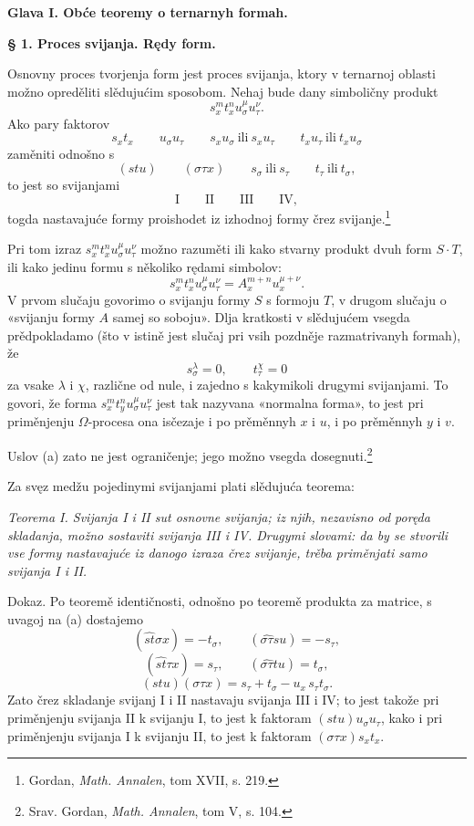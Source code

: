 \documentclass[11pt]{article}
\begin{document}
\begin{center}
{\Large\bfseries Glava I. \quad Obće teoremy o ternarnyh formah.}
\end{center}

\begin{center}
\textbf{§ 1. \quad Proces svijanja. \quad Rędy form.}
\end{center}

Osnovny proces tvorjenja form jest proces svijanja, ktory v ternarnoj oblasti možno opreděliti slědujućim sposobom. Nehaj bude dany simboličny produkt
\[
s_x^m t_x^n u_\sigma^\mu u_\tau^\nu .
\]
Ako pary faktorov
\[
s_xt_x\qquad u_\sigma u_\tau\qquad s_xu_\sigma\ \text{ili}\ s_xu_\tau
\qquad t_xu_\tau\ \text{ili}\ t_xu_\sigma
\]
zaměniti odnošno s
\[
(stu)\qquad (\sigma\tau x)\qquad s_\sigma\ \text{ili}\ s_\tau
\qquad t_\tau\ \text{ili}\ t_\sigma,
\]
to jest so svijanjami
\[
\text{I}\qquad\text{II}\qquad\text{III}\qquad\text{IV},
\]
togda nastavajuće formy proishodet iz izhodnoj formy črez svijanje.\footnote{Gordan, \emph{Math. Annalen}, tom XVII, s. 219.}

Pri tom izraz $s_x^m t_x^n u_\sigma^\mu u_\tau^\nu$ možno razuměti ili kako stvarny produkt dvuh form $S\cdot T$, ili kako jedinu formu s několiko rędami simbolov:
\[
s_x^m t_x^n u_\sigma^\mu u_\tau^\nu=A_x^{m+n}u_x^{\mu+\nu}.
\]
V prvom slučaju govorimo o svijanju formy $S$ s formoju $T$, v drugom slučaju o «svijanju formy $A$ samej so soboju». Dlja kratkosti v slědujućem vsegda prědpokladamo (što v istině jest slučaj pri vsih pozdněje razmatrivanyh formah), že
\[
\tag{a}
s_\sigma^\lambda=0,\qquad t_\tau^\chi=0
\]
za vsake $\lambda$ i $\chi$, različne od nule, i zajedno s kakymikoli drugymi svijanjami. To govori, že forma $s_x^m t_y^n u_\sigma^\mu u_\tau^\nu$ jest tak nazyvana «normalna forma», to jest pri priměnjenju $\Omega$-procesa ona isčezaje i po prěměnnyh $x$ i $u$, i po prěměnnyh $y$ i $v$.

Uslov (a) zato ne jest ograničenje; jego možno vsegda dosegnuti.\footnote{Srav. Gordan, \emph{Math. Annalen}, tom V, s. 104.}

Za svęz medžu pojedinymi svijanjami plati slědujuća teorema:

{\itshape Teorema I. Svijanja I i II sut osnovne svijanja; iz njih, nezavisno od poręda skladanja, možno sostaviti svijanja III i IV. Drugymi slovami: da by se stvorili vse formy nastavajuće iz danogo izraza črez svijanje, trěba priměnjati samo svijanja I i II.}

Dokaz. Po teoremě identičnosti, odnošno po teoremě produkta za matrice, s uvagoj na (a) dostajemo
\[
(\widehat{st}\sigma x)=-t_\sigma,\qquad
(\widehat{\sigma\tau}su)=-s_\tau,
\]
\[
(\widehat{st}\tau x)=s_\tau,\qquad
(\widehat{\sigma\tau}tu)=t_\sigma,
\]
\[
(stu)(\sigma\tau x)=s_\tau+t_\sigma-u_x\,s_\tau t_\sigma .
\]
Zato črez skladanje svijanj I i II nastavaju svijanja III i IV; to jest takože pri priměnjenju svijanja II k svijanju I, to jest k faktoram $(stu)u_\sigma u_\tau$, kako i pri priměnjenju svijanja I k svijanju II, to jest k faktoram $(\sigma\tau x)s_xt_x$.
\end{document}
